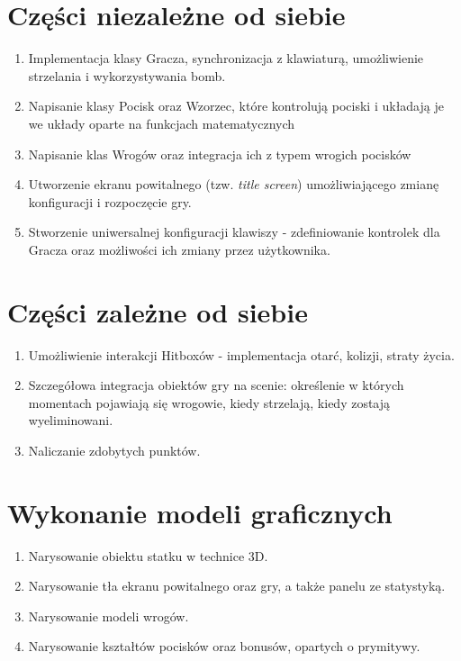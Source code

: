 \documentclass[a4paper,twoside]{article}
\begin{document}
		\section{Części niezależne od siebie}
			\begin{enumerate}[label=\alph*.]
				\item Implementacja klasy Gracza, synchronizacja z klawiaturą, umożliwienie strzelania i wykorzystywania bomb.
				\item Napisanie klasy Pocisk oraz Wzorzec, które kontrolują pociski i układają je we układy oparte na funkcjach matematycznych
				\item Napisanie klas Wrogów oraz integracja ich z typem wrogich pocisków
				\item Utworzenie ekranu powitalnego (tzw. \emph{title screen}) umożliwiającego zmianę konfiguracji i rozpoczęcie gry.
				\item Stworzenie uniwersalnej konfiguracji klawiszy - zdefiniowanie kontrolek dla Gracza oraz możliwości ich zmiany przez użytkownika.
			\end{enumerate}
		\section{Części zależne od siebie}
			\begin{enumerate}[label=\alph*.]
				\item Umożliwienie interakcji Hitboxów - implementacja otarć, kolizji, straty życia.
				\item Szczegółowa integracja obiektów gry na scenie: określenie w których momentach pojawiają się wrogowie, kiedy strzelają, kiedy zostają wyeliminowani.
				\item Naliczanie zdobytych punktów.
			\end{enumerate}
		\section{Wykonanie modeli graficznych}
			\begin{enumerate}[label=\alph*.]
				\item Narysowanie obiektu statku w technice 3D.
				\item Narysowanie tła ekranu powitalnego oraz gry, a także panelu ze statystyką.
				\item Narysowanie modeli wrogów.
				\item Narysowanie kształtów pocisków oraz bonusów, opartych o prymitywy.
			\end{enumerate}
		
\end{document}
